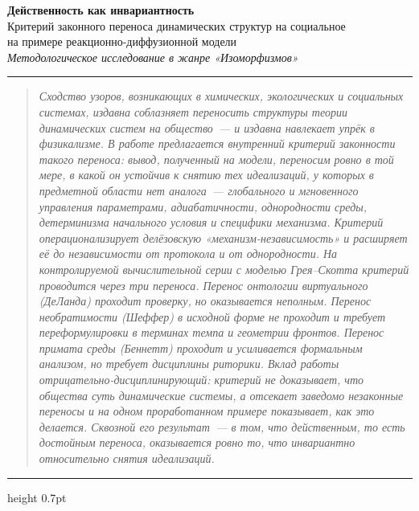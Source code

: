 \documentclass[11pt]{article}
\newcommand{\ruleline}{{\color{acmag!40}\hrule height 0.7pt}}
\begin{document}
\thispagestyle{fancy}
\begin{center}
{\sffamily\bfseries\fontsize{20}{25}\selectfont\color{acmag}
Действенность как инвариантность}\\[3mm]
{\sffamily\large\color{accyan}
Критерий законного переноса динамических структур на социальное}\\[2mm]
{\sffamily\normalsize\color{acgrey}
на примере реакционно-диффузионной модели}\\[5mm]
{\itshape\color{acgrey}Методологическое исследование в жанре «Изоморфизмов»}\\[1mm]
{\small\color{acgrey}\rule{40mm}{0.4pt}}
\end{center}
\vspace{1mm}
\noindent\ruleline
\begin{quotation}\small\itshape\color{acink}
Сходство узоров, возникающих в химических, экологических и социальных системах, издавна соблазняет переносить
структуры теории динамических систем на общество~— и издавна навлекает упрёк в физикализме. В работе предлагается
\emph{внутренний} критерий законности такого переноса: вывод, полученный на модели, переносим ровно в той мере,
в какой он устойчив к снятию тех идеализаций, у которых в предметной области нет аналога~— глобального и
мгновенного управления параметрами, адиабатичности, однородности среды, детерминизма начального условия и
специфики механизма. Критерий операционализирует делёзовскую «механизм-независимость» и расширяет её до
независимости от протокола и от однородности. На контролируемой вычислительной серии с моделью Грея–Скотта
критерий проводится через три переноса. Перенос онтологии виртуального (ДеЛанда) проходит проверку, но
оказывается неполным. Перенос необратимости (Шеффер) в исходной форме не проходит и требует переформулировки в
терминах темпа и геометрии фронтов. Перенос примата среды (Беннетт) проходит и усиливается формальным анализом,
но требует дисциплины риторики. Вклад работы отрицательно-дисциплинирующий: критерий не доказывает, что общества
суть динамические системы, а отсекает заведомо незаконные переносы и на одном проработанном примере показывает,
как это делается. Сквозной его результат~— в том, что действенным, то есть достойным переноса, оказывается ровно
то, что инвариантно относительно снятия идеализаций.
\end{quotation}
\ruleline
\vspace{2mm}

\end{document}
